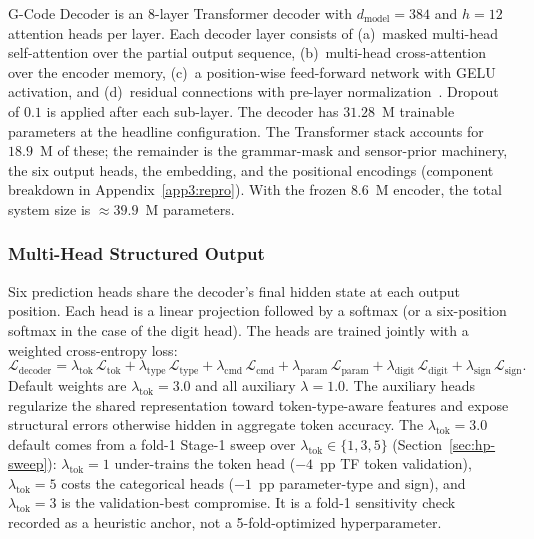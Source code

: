 \documentclass[sensors,article,submit,moreauthors,pdftex]{Definitions/mdpi}
\newcommand{\modelname}{G-Code Decoder}
\begin{document}
\modelname{} is an 8-layer Transformer decoder with $d_{\text{model}}=384$ and $h=12$ attention heads per layer. Each decoder layer consists of (a)~masked multi-head self-attention over the partial output sequence, (b)~multi-head cross-attention over the encoder memory, (c)~a position-wise feed-forward network with GELU activation, and (d)~residual connections with pre-layer normalization~\cite{ba2016layernorm}. Dropout~\cite{srivastava2014dropout} of $0.1$ is applied after each sub-layer. The decoder has $31.28$~M trainable parameters at the headline configuration. The Transformer stack accounts for $18.9$~M of these; the remainder is the grammar-mask and sensor-prior machinery, the six output heads, the embedding, and the positional encodings (component breakdown in Appendix~\ref{app3:repro}). With the frozen $8.6$~M encoder, the total system size is $\approx\!39.9$~M parameters.

\subsubsection{Multi-Head Structured Output}
\label{sec:multihead}

Six prediction heads share the decoder's final hidden state at each output position. Each head is a linear projection followed by a softmax (or a six-position softmax in the case of the digit head). The heads are trained jointly with a weighted cross-entropy loss:
\begin{equation*}
\mathcal{L}_{\text{decoder}} =
    \lambda_{\text{tok}}\,\mathcal{L}_{\text{tok}} +
    \lambda_{\text{type}}\,\mathcal{L}_{\text{type}} +
    \lambda_{\text{cmd}}\,\mathcal{L}_{\text{cmd}} +
    \lambda_{\text{param}}\,\mathcal{L}_{\text{param}} +
    \lambda_{\text{digit}}\,\mathcal{L}_{\text{digit}} +
    \lambda_{\text{sign}}\,\mathcal{L}_{\text{sign}}.
\end{equation*}
Default weights are $\lambda_{\text{tok}}=3.0$ and all auxiliary $\lambda=1.0$. The auxiliary heads regularize the shared representation toward token-type-aware features and expose structural errors otherwise hidden in aggregate token accuracy. The $\lambda_{\text{tok}}=3.0$ default comes from a fold-1 Stage-1 sweep over $\lambda_{\text{tok}}\!\in\!\{1, 3, 5\}$ (Section~\ref{sec:hp-sweep}): $\lambda_{\text{tok}}=1$ under-trains the token head ($-4$~pp TF token validation), $\lambda_{\text{tok}}=5$ costs the categorical heads ($-1$~pp parameter-type and sign), and $\lambda_{\text{tok}}=3$ is the validation-best compromise. It is a fold-1 sensitivity check recorded as a heuristic anchor, not a 5-fold-optimized hyperparameter.
\end{document}
